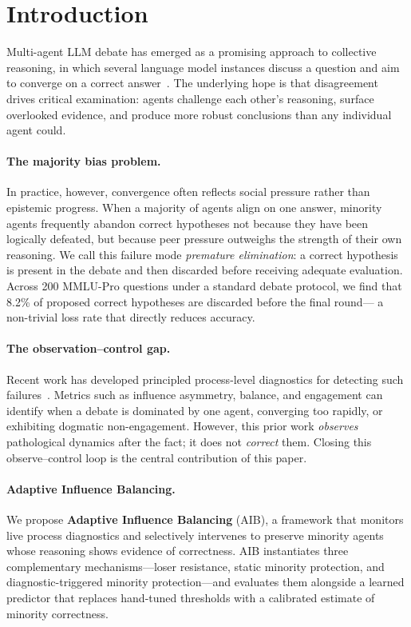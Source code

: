 \section{Introduction}
\label{sec:intro}

Multi-agent LLM debate has emerged as a promising approach to collective
reasoning, in which several language model instances discuss a question and
aim to converge on a correct answer~\cite{du2023improving,liang2023encouraging,
chan2023chateval}.
The underlying hope is that disagreement drives critical examination:
agents challenge each other's reasoning, surface overlooked evidence, and
produce more robust conclusions than any individual agent could.

\paragraph{The majority bias problem.}
In practice, however, convergence often reflects social pressure rather than
epistemic progress.
When a majority of agents align on one answer, minority agents frequently
abandon correct hypotheses not because they have been logically defeated,
but because peer pressure outweighs the strength of their own reasoning.
We call this failure mode \emph{premature elimination}: a correct hypothesis
is present in the debate and then discarded before receiving adequate
evaluation.
Across 200 MMLU-Pro questions under a standard debate protocol, we find that
8.2\% of proposed correct hypotheses are discarded before the final round—
a non-trivial loss rate that directly reduces accuracy.

\paragraph{The observation–control gap.}
Recent work has developed principled process-level diagnostics for detecting
such failures~\cite{diagnostic2026}.
Metrics such as influence asymmetry, balance, and engagement can identify
when a debate is dominated by one agent, converging too rapidly, or
exhibiting dogmatic non-engagement.
However, this prior work \emph{observes} pathological dynamics after the
fact; it does not \emph{correct} them.
Closing this observe–control loop is the central contribution of this paper.

\paragraph{Adaptive Influence Balancing.}
We propose \textbf{Adaptive Influence Balancing} (AIB), a framework that
monitors live process diagnostics and selectively intervenes to preserve
minority agents whose reasoning shows evidence of correctness.
AIB instantiates three complementary mechanisms—loser resistance, static
minority protection, and diagnostic-triggered minority protection—and
evaluates them alongside a learned predictor that replaces hand-tuned
thresholds with a calibrated estimate of minority correctness.

